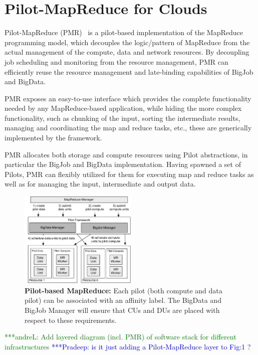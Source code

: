 \documentclass[times]{cpeauth}
\newcommand{\alnote}[1]{ {\textcolor{green} { ***andreL: #1 }}}
\newcommand{\pmnote}[1]{ {\textcolor{blue} { ***Pradeep: #1 }}}
\newcommand{\alnote}[1]{}
\newcommand{\pmnote}[1]{}
\newcommand{\pilot}{Pilot\xspace}
\newcommand{\pilots}{Pilots\xspace}
\begin{document}
\section{Pilot-MapReduce for Clouds}

Pilot-MapReduce (PMR)~\cite{Mantha:2012:PEF:2287016.2287020} is a pilot-based
implementation of the MapReduce programming model, which decouples the
logic/pattern of MapReduce from the actual management of the compute, data and
network resources. By decoupling job scheduling and monitoring from the
resource management, PMR can efficiently reuse the resource management and
late-binding capabilities of BigJob and BigData.

PMR exposes an easy-to-use interface which provides the complete
functionality needed by any MapReduce-based application, while hiding
the more complex functionality, such as chunking of the input, sorting
the intermediate results, managing and coordinating the map and reduce
tasks, etc., these are generically implemented by the
framework.

PMR allocates both storage and compute resources using \pilot abstractions, in
particular the BigJob and BigData implementation. Having spawned a set of
\pilots, PMR can flexibly utilized for them for executing map and reduce tasks
as well as for managing the input, intermediate and output data.


\begin{figure}[t]
	\centering
	\includegraphics[width=0.5\textwidth]{figures/mr-arch.pdf}
	\caption{\textbf{Pilot-based MapReduce:} Each pilot (both compute and data 
	pilot) can be associated with an affinity label. The BigData and BigJob 
	Manager will ensure that CUs and DUs are placed with respect to these 
	requirements.}
	\label{fig:figures_mapreduce-pilotdata}
\end{figure}


\alnote{Add layered diagram (incl. PMR) of software stack for different 
infrastructures}
\pmnote{ is it just adding a Pilot-MapReduce layer to Fig:1 ? }
\end{document}
